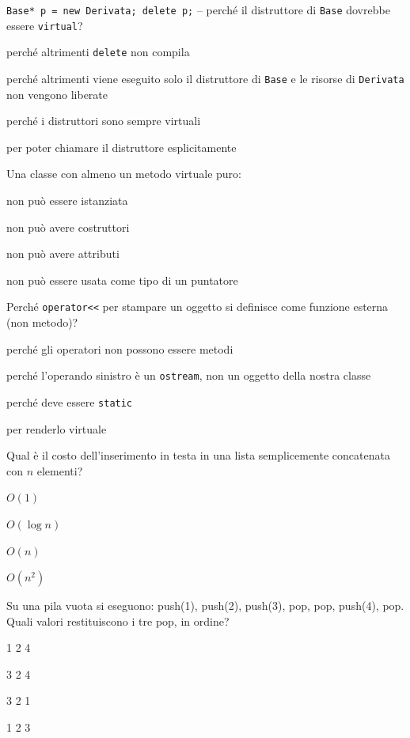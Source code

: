 \begin{quiz}{\texttt{Base* p = new Derivata; delete p;} -- perché il distruttore di \texttt{Base} dovrebbe essere \texttt{virtual}?}
  \item perché altrimenti \texttt{delete} non compila
  \item perché altrimenti viene eseguito solo il distruttore di \texttt{Base} e le risorse di \texttt{Derivata} non vengono liberate
  \item perché i distruttori sono sempre virtuali
  \item per poter chiamare il distruttore esplicitamente
\end{quiz}

\begin{quiz}{Una classe con almeno un metodo virtuale puro:}
  \item non può essere istanziata
  \item non può avere costruttori
  \item non può avere attributi
  \item non può essere usata come tipo di un puntatore
\end{quiz}

\begin{quiz}{Perché \texttt{operator<<} per stampare un oggetto si definisce come funzione esterna (non metodo)?}
  \item perché gli operatori non possono essere metodi
  \item perché l'operando sinistro è un \texttt{ostream}, non un oggetto della nostra classe
  \item perché deve essere \texttt{static}
  \item per renderlo virtuale
\end{quiz}

\begin{quiz}{Qual è il costo dell'inserimento in testa in una lista semplicemente concatenata con $n$ elementi?}
  \item $O(1)$
  \item $O(\log n)$
  \item $O(n)$
  \item $O(n^2)$
\end{quiz}

\begin{quiz}{Su una pila vuota si eseguono: push(1), push(2), push(3), pop, pop, push(4), pop. Quali valori restituiscono i tre pop, in ordine?}
  \item 1 2 4
  \item 3 2 4
  \item 3 2 1
  \item 1 2 3
\end{quiz}


